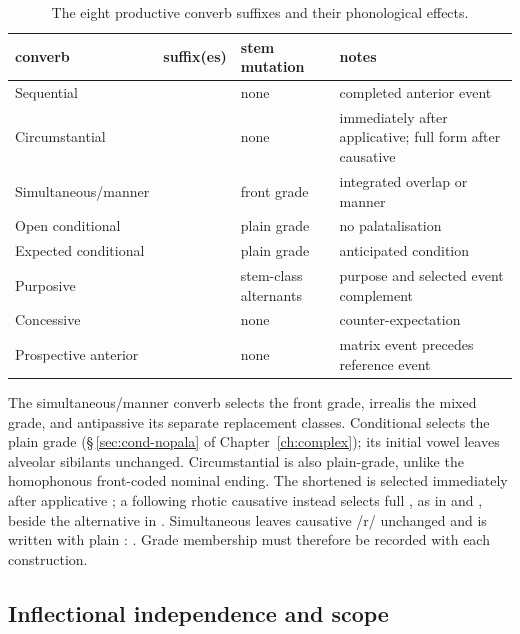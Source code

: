 \begin{table}[ht]
	\footnotesize
	\caption{The eight productive converb suffixes and their phonological effects.}\label{tab:converb-morph}
	\begin{tabularx}{\textwidth}{L L L L}
		\toprule
		{\sc converb} & {\sc suffix(es)} & {\sc stem mutation} & {\sc notes} \\
		\midrule
        Sequential &  & none & completed anterior event \\
        Circumstantial &  & none &  immediately after applicative; full form after causative \\
        Simultaneous/manner &  & front grade & integrated overlap or manner \\
        Open conditional &  & plain grade & no palatalisation \\
        Expected conditional &  & plain grade & anticipated condition \\
        Purposive &  & stem-class alternants & purpose and selected event complement \\
        Concessive &  & none & counter-expectation \\
        Prospective anterior &  & none & matrix event precedes reference event \\
		\bottomrule
	\end{tabularx}
\end{table}

The simultaneous/manner converb  selects the front grade,
irrealis  the mixed grade, and antipassive  its separate
replacement classes. Conditional  selects the plain grade
(§\,\ref{sec:cond-nopala} of Chapter~\ref{ch:complex}); its initial vowel
leaves alveolar sibilants unchanged. Circumstantial  is also
plain-grade, unlike the homophonous front-coded nominal ending. The shortened
 is selected immediately after applicative ; a following
rhotic causative instead selects full , as in 
and , beside the alternative in . Simultaneous
 leaves causative /r/ unchanged and is written with plain
: .
Grade membership must therefore be recorded with each construction.


\subsection{Inflectional independence and scope}
\label{sec:converb-inflection-scope}

